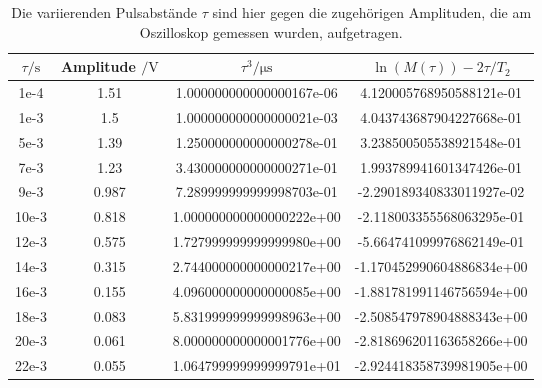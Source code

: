 \begin{table} \caption{Die variierenden Pulsabstände $\tau$ sind hier gegen die zugehörigen Amplituden, die am Oszilloskop gemessen wurden, aufgetragen.}
    \label{tab:t2}
    \centering
    \begin{tabular}{S[] S[] | S[] S[]}
        \toprule
        {$\tau / \si{\second}$} & {Amplitude $/ \si{\volt}$} & {$\tau^3 / \si{\micro\second}$} & {$\ln\left(M(\tau)\right) - 2\tau/T_2$} \\
        \midrule
        1e-4  &  1.51   &  1.000000000000000167e-06 & 4.120005768950588121e-01 \\
        1e-3  &  1.5    &  1.000000000000000021e-03 & 4.043743687904227668e-01 \\
        5e-3  &  1.39   &  1.250000000000000278e-01 & 3.238500505538921548e-01 \\
        7e-3  &  1.23   &  3.430000000000000271e-01 & 1.993789941601347426e-01 \\
        9e-3  &  0.987  &  7.289999999999998703e-01 & -2.290189340833011927e-02 \\
        10e-3 &  0.818  &  1.000000000000000222e+00 & -2.118003355568063295e-01 \\
        12e-3 &  0.575  &  1.727999999999999980e+00 & -5.664741099976862149e-01 \\
        14e-3 &  0.315  &  2.744000000000000217e+00 & -1.170452990604886834e+00 \\
        16e-3 &  0.155  &  4.096000000000000085e+00 & -1.881781991146756594e+00 \\
        18e-3 &  0.083  &  5.831999999999998963e+00 & -2.508547978904888343e+00 \\
        20e-3 &  0.061  &  8.000000000000001776e+00 & -2.818696201163658266e+00 \\
        22e-3 &  0.055  &  1.064799999999999791e+01 & -2.924418358739981905e+00 \\
        \bottomrule
    \end{tabular}
\end{table}